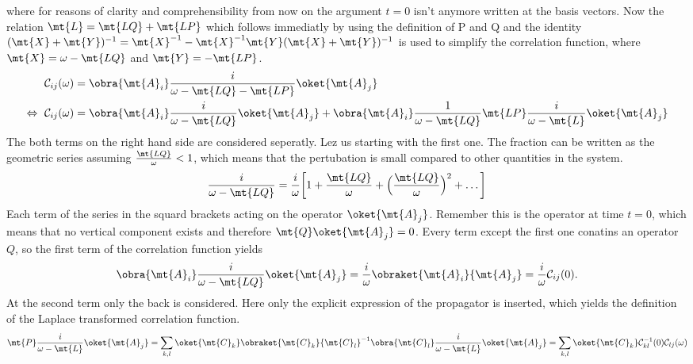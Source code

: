 %
where for reasons of clarity and comprehensibility from now on the argument $t=0$ isn't anymore written at the basis vectors.
Now the relation $\mt{L} = \mt{LQ} + \mt{LP}$ which follows immediatly by using the definition of P and Q and the identity $ (\mt{X} + \mt{Y})^{-1} = \mt{X}^{-1} - \mt{X}^{-1} \mt{Y} (\mt{X} + \mt{Y})^{-1}$ is used to simplify the correlation function, where $\mt{X} = \omega - \mt{LQ}$ and $\mt{Y} = -\mt{LP}$.
%
\begin{align}
	\mathcal{C}_{ij}(\omega) &= \obra{\mt{A}_{i}} \frac{i}{\omega - \mt{LQ} - \mt{LP}} \oket{\mt{A}_{j}}
	\notag \\
	\Leftrightarrow\ \mathcal{C}_{ij}(\omega) &= \obra{\mt{A}_{i}} \frac{i}{\omega - \mt{LQ}} \oket{\mt{A}_{j}} + \obra{\mt{A}_{i}} \frac{1}{\omega - \mt{LQ}} \mt{LP} \frac{i}{\omega - \mt{L}} \oket{\mt{A}_{j}}
\end{align}
%
The both terms on the right hand side are considered seperatly.
Lez us starting with the first one.
The fraction can be written as the geometric series assuming $\frac{\mt{LQ}}{\omega} < 1$, which means that the pertubation is small compared to other quantities in the system. 
%
\begin{align}
	\frac{i}{\omega - \mt{LQ}} = \frac{i}{\omega} \bigg[1 + \frac{\mt{LQ}}{\omega} + \Big(\frac{\mt{LQ}}{\omega}\Big)^{2} + \dots \bigg]
\end{align}
%
Each term of the series in the squard brackets acting on the operator $\oket{\mt{A}_{j}}$.
Remember this is the operator at time $t=0$, which means that no vertical component exists and therefore $\mt{Q}\oket{\mt{A}_{j}} = 0$.
Every term except the first one conatins an operator $Q$, so the first term of the correlation function yields
%
\begin{align}
	\obra{\mt{A}_{i}} \frac{i}{\omega - \mt{LQ}} \oket{\mt{A}_{j}} = \frac{i}{\omega} \obraket{\mt{A}_{i}}{\mt{A}_{j}} = \frac{i}{\omega} \mathcal{C}_{ij}(0).
\end{align}
%
At the second term only the back is considered.
Here only the explicit expression of the propagator is inserted, which yields the definition of the Laplace transformed correlation function.
%
\begin{align}
	\mt{P} \frac{i}{\omega - \mt{L}} \oket{\mt{A}_{j}} = \sum\limits_{k,l} \oket{\mt{C}_{k}} \obraket{\mt{C}_{k}}{\mt{C}_{l}}^{-1} \obra{\mt{C}_{l}} \frac{i}{\omega - \mt{L}} \oket{\mt{A}_{j}} = \sum\limits_{k,l} \oket{\mt{C}_{k}} \mathcal{C}_{kl}^{-1}(0) \mathcal{C}_{lj}(\omega)
\end{align}
